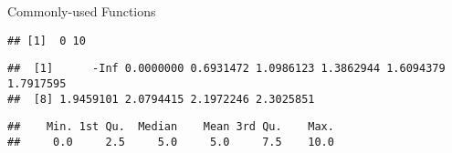 \begin{frame}[fragile]{Commonly-used Functions}
\protect\hypertarget{commonly-used-functions-1}{}

\begin{Shaded}
\begin{Highlighting}[]
\StringTok{ }\NormalTok{(}\NormalTok{,}\NormalTok{)}
\end{Highlighting}
\end{Shaded}

\begin{verbatim}
## [1]  0 10
\end{verbatim}

\begin{Shaded}
\begin{Highlighting}[]
\end{Highlighting}
\end{Shaded}

\begin{verbatim}
##  [1]      -Inf 0.0000000 0.6931472 1.0986123 1.3862944 1.6094379 1.7917595
##  [8] 1.9459101 2.0794415 2.1972246 2.3025851
\end{verbatim}

\begin{Shaded}
\begin{Highlighting}[]
\end{Highlighting}
\end{Shaded}

\begin{verbatim}
##    Min. 1st Qu.  Median    Mean 3rd Qu.    Max. 
##     0.0     2.5     5.0     5.0     7.5    10.0
\end{verbatim}

\end{frame}

